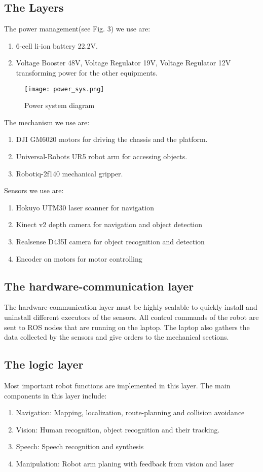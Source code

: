 \documentclass[runningheads,UTF8,fntef,a4paper]{llncs}
\begin{document}
\subsection{The Layers}

The power management(see Fig. 3) we use are:
\begin{enumerate}
	\item 6-cell li-ion battery 22.2V.
	\item Voltage Booster 48V, Voltage Regulator 19V, Voltage Regulator 12V transforming power for the other equipments.
\end{enumerate}
\begin{figure}[!t]
	\centering
	\texttt{[image: power\_sys.png]}
	\caption{Power system diagram}
	\label{pow_sys}
\end{figure}

The mechanism we use are:
\begin{enumerate}
	\item DJI GM6020 motors for driving the chassis and the platform.
	\item Universal-Robots UR5 robot arm for accessing objects.
	\item Robotiq-2f140 mechanical gripper.
\end{enumerate}

Sensors we use are:
\begin{enumerate}
	\item Hokuyo UTM30 laser scanner for navigation
	\item Kinect v2 depth camera for navigation and object detection
	\item Realsense D435I camera for object recognition and detection
	\item Encoder on motors for motor controlling
\end{enumerate}

\subsection{The hardware-communication layer}
The hardware-communication layer must be highly scalable to quickly install and uninstall diﬀerent executors of the sensors. All control commands of the robot are sent to ROS nodes that are running on the laptop. The laptop also gathers the data collected by the sensors and give orders to the mechanical sections.

\subsection{The logic layer}
Most important robot functions are implemented in this layer. 
The main components in this layer include:
\begin{enumerate}
	\item Navigation: Mapping, localization, route-planning and collision avoidance
	\item Vision: Human recognition, object recognition and their tracking.
	\item Speech: Speech recognition and synthesis
	\item Manipulation: Robot arm planing with feedback from vision and laser
\end{enumerate}
\end{document}
